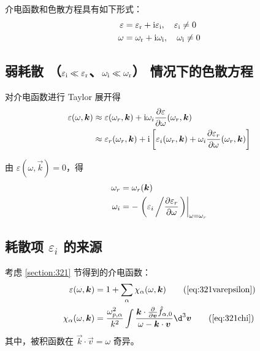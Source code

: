 介电函数和色散方程具有如下形式：
\begin{subequations}\begin{align}
\varepsilon &= \varepsilon_{\mathrm{r}} + \mathrm{i} \varepsilon_{\mathrm{i}}, \quad \varepsilon_{\mathrm{i}} \neq 0 \\
\omega &= \omega_{\mathrm{r}} + \mathrm{i} \omega_{\mathrm{i}}, \quad \omega_{\mathrm{i}} \neq 0
\end{align}\end{subequations}

\subsection{
    弱耗散
    \texorpdfstring{（$\varepsilon_{\mathrm{i}} \ll \varepsilon_{\mathrm{r}}$、$\omega_{\mathrm{i}} \ll \omega_{\mathrm{r}}$）}{}
    情况下的色散方程
}

对介电函数进行 Taylor 展开得
\begin{equation}\begin{aligned}
\varepsilon(\omega, \bm{k})
&\approx \varepsilon(\omega_r, \bm{k})
+ \mathrm{i} \omega_i \pdv{\varepsilon}{\omega}(\omega_r, \bm{k}) \\
&\approx \varepsilon_r(\omega_r, \bm{k})
+ \mathrm{i} \left[ \varepsilon_i(\omega_r, \bm{k})
+ \omega_i \pdv{\varepsilon_r}{\omega}(\omega_r, \bm{k}) \right]
\end{aligned}\end{equation}

由 $\varepsilon(\omega, \vec{k}) = 0$，得
\begin{subequations}\begin{align}
\omega_r &= \omega_r(\bm{k}) \\
\omega_i &= - \left.\left(
    \varepsilon_i \left/ \pdv{\varepsilon_r}{\omega} \right.
\right)\right|_{\omega=\omega_r}
\end{align}\end{subequations}

\subsection{耗散项 \texorpdfstring{$\varepsilon_i$}{} 的来源}

考虑 \ref{section:321} 节得到的介电函数：
\begin{subequations}\begin{align}
\varepsilon(\omega, \vec{k}) &= 1 + \sum_\alpha \chi_\alpha(\omega, \vec{k}) \tag{\ref{eq:321varepsilon}}\\
\chi_\alpha(\omega, \vec{k})
&= \frac{\omega_{p,\alpha}^2}{k^2}
\int \frac{\vec{k} \cdot \pdv{}{\vec{v}} \hat{f}_{\alpha,0}}{\omega - \vec{k} \cdot \vec{v}} \d^3 \vec{v} \tag{\ref{eq:321chi}}
\end{align}\end{subequations}
其中，被积函数在 $\vec{k} \cdot \vec{v} = \omega$ 奇异。

